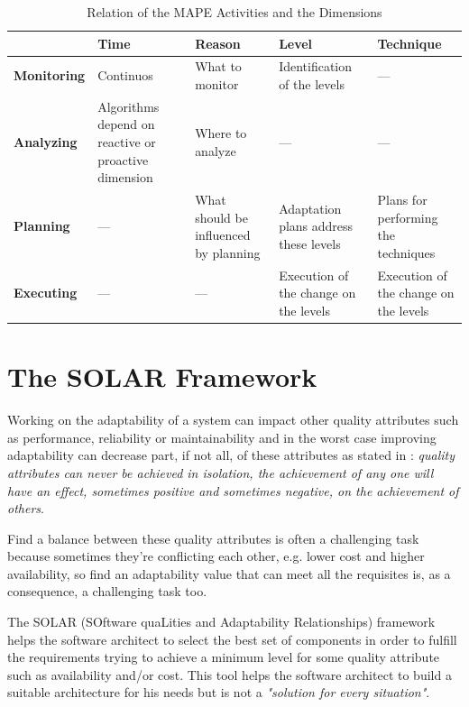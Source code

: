 \begin{table}[ht!b]
	\centering
	\begin{tabular}{|l||p{2.4cm}|p{2.4cm}|p{2.4cm}|p{2.4cm}|}
		\hline 
		& \textbf{Time} & \textbf{Reason} & \textbf{Level} & \textbf{Technique} \\ 
		\hline 
		\textbf{Monitoring} & Continuos & What to monitor & Identification of the levels & --- \\ 
		\hline 
		\textbf{Analyzing} & Algorithms depend on reactive or proactive dimension & Where to analyze & --- & --- \\ 
		\hline 
		\textbf{Planning} & --- & What should be influenced by planning & Adaptation plans address these levels & Plans for performing the techniques \\ 
		\hline 
		\textbf{Executing} & --- & --- & Execution of the change on the levels & Execution of the change on the levels \\ 
		\hline 
	
	\end{tabular} 
\caption[MAPE and Dimensions]{Relation of the MAPE Activities and the Dimensions}
\label{tab:mape}
\end{table}

\section{The SOLAR Framework}
\label{sec:solar-framework}
Working on the adaptability of a system can impact other quality attributes such as performance, reliability or maintainability and in the worst case improving adaptability can decrease part, if not all, of these attributes as stated in \cite{bass2003software}: \emph{quality attributes can never be achieved in isolation, the achievement of any one will have an effect, sometimes positive and sometimes negative, on the achievement of others}.

Find a balance between these quality attributes is often a challenging task because sometimes they're conflicting each other, e.g. lower cost and higher availability, so find an adaptability value that can meet all the requisites is, as a consequence, a challenging task too.

The SOLAR (SOftware quaLities and Adaptability Relationships) framework \cite{solar} helps the software architect to select the best set of components in order to fulfill the requirements trying to achieve a minimum level for some quality attribute such as availability and/or cost. This tool helps the software architect to build a suitable architecture for his needs but is not a \emph{"solution for every situation"}.

